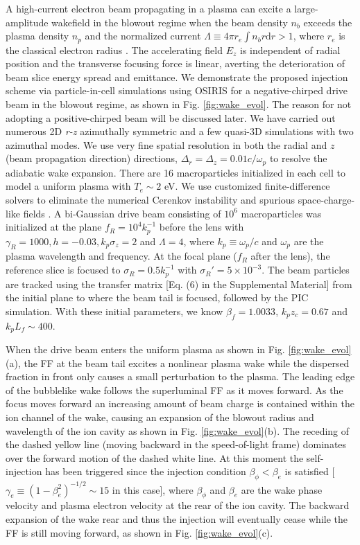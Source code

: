 \documentclass[
aps,
prl,
reprint,
superscriptaddress,
amsmath,
amssymb,
showpacs
]{revtex4-2}
\begin{document}
A high-current electron beam propagating in a plasma can excite a large-amplitude wakefield in the blowout regime when the beam density $n_b$ exceeds the plasma density $n_p$ and the normalized current $\Lambda\equiv4\pi r_e\int n_b r\text{d}r>1$, where $r_e$ is the classical electron radius \cite{Rosenzweig1991,Lu2006a}. The accelerating field $E_z$ is independent of radial position and the transverse focusing force is linear, averting the deterioration of beam slice energy spread and emittance. We demonstrate the proposed injection scheme via particle-in-cell simulations using OSIRIS \cite{Fonseca2002} for a negative-chirped drive beam in the blowout regime, as shown in Fig. \ref{fig:wake_evol}. The reason for not adopting a positive-chirped beam will be discussed later. We have carried out numerous 2D {\it r-z} azimuthally symmetric and a few quasi-3D simulations with two azimuthal modes. We use very fine spatial resolution in both the radial and $z$ (beam propagation direction) directions, $\Delta_r=\Delta_z=0.01c/\omega_p$ to resolve the adiabatic wake expansion. There are 16 macroparticles initialized in each cell to model a uniform plasma with $T_e\sim2$ eV.
We use customized finite-difference solvers \cite{Li2021,Li2017} to eliminate the numerical Cerenkov instability \cite{Xu2013} and spurious space-charge-like fields \cite{Xu2020}. A bi-Gaussian drive beam consisting of $10^6$ macroparticles was initialized at the plane $f_R=10^4 k_p^{-1}$ before the lens with $\gamma_R=1000, h=-0.03, k_p \sigma_z=2$ and $\Lambda=4$, where $k_p\equiv\omega_p/c$ and $\omega_p$ are the plasma wavelength and frequency. At the focal plane ($f_R$ after the lens), the reference slice is focused to $\sigma_R=0.5k_p^{-1}$ with $\sigma_R'=5\times10^{-3}$. The beam particles are tracked using the transfer matrix [Eq. (6) in the Supplemental Material] from the initial plane to where the beam tail is focused, followed by the PIC simulation. With these initial parameters, we know $\beta_f=1.0033$, $k_p z_c=0.67$ and $k_pL_f\sim400$.  

When the drive beam enters the uniform plasma as shown in Fig. \ref{fig:wake_evol}(a), the FF at the beam tail excites a nonlinear plasma wake while the dispersed fraction in front only causes a small perturbation to the plasma. The leading edge of the bubblelike wake follows the superluminal FF as it moves forward. As the focus moves forward an increasing amount of beam charge is contained within the ion channel of the wake, causing an expansion of the blowout radius and wavelength of the ion cavity as shown in Fig. \ref{fig:wake_evol}(b). The receding of the dashed yellow line (moving backward in the speed-of-light frame) dominates over the forward motion of the dashed white line. At this moment the self-injection has been triggered since the injection condition $\beta_\phi<\beta_e$ is satisfied [$\gamma_e\equiv(1-\beta_e^2)^{-1/2}\sim15$ in this case], where $\beta_\phi$ and $\beta_e$ are the wake phase velocity and plasma electron velocity at the rear of the ion cavity. The backward expansion of the wake rear and thus the injection will eventually cease while the FF is still moving forward, as shown in Fig. \ref{fig:wake_evol}(c).
\end{document}
